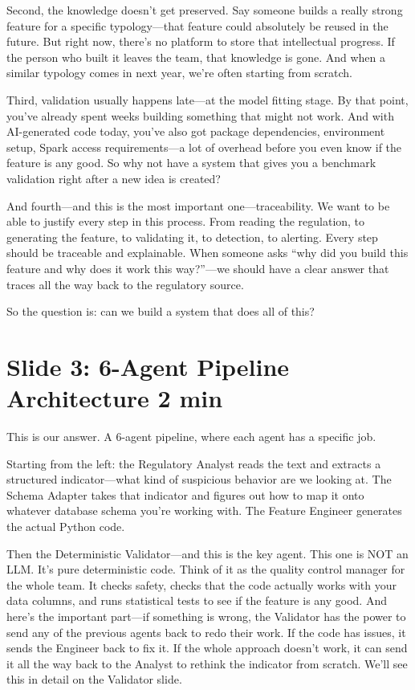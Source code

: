 \documentclass[11pt, a4paper]{article}
\newcommand{\timing}[1]{{\hfill\small\color{gray}#1}}
\begin{document}
Second, the knowledge doesn't get preserved. Say someone builds a really strong feature for a specific typology---that feature could absolutely be reused in the future. But right now, there's no platform to store that intellectual progress. If the person who built it leaves the team, that knowledge is gone. And when a similar typology comes in next year, we're often starting from scratch.

Third, validation usually happens late---at the model fitting stage. By that point, you've already spent weeks building something that might not work. And with AI-generated code today, you've also got package dependencies, environment setup, Spark access requirements---a lot of overhead before you even know if the feature is any good. So why not have a system that gives you a benchmark validation right after a new idea is created?

And fourth---and this is the most important one---traceability. We want to be able to justify every step in this process. From reading the regulation, to generating the feature, to validating it, to detection, to alerting. Every step should be traceable and explainable. When someone asks ``why did you build this feature and why does it work this way?''---we should have a clear answer that traces all the way back to the regulatory source.

So the question is: can we build a system that does all of this?

\section{Slide 3: 6-Agent Pipeline Architecture \timing{2 min}}

This is our answer. A 6-agent pipeline, where each agent has a specific job.

Starting from the left: the Regulatory Analyst reads the text and extracts a structured indicator---what kind of suspicious behavior are we looking at. The Schema Adapter takes that indicator and figures out how to map it onto whatever database schema you're working with. The Feature Engineer generates the actual Python code.

Then the Deterministic Validator---and this is the key agent. This one is NOT an LLM. It's pure deterministic code. Think of it as the quality control manager for the whole team. It checks safety, checks that the code actually works with your data columns, and runs statistical tests to see if the feature is any good. And here's the important part---if something is wrong, the Validator has the power to send any of the previous agents back to redo their work. If the code has issues, it sends the Engineer back to fix it. If the whole approach doesn't work, it can send it all the way back to the Analyst to rethink the indicator from scratch. We'll see this in detail on the Validator slide.
\end{document}
